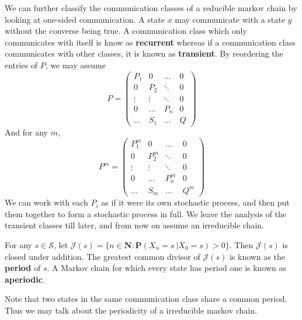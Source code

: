 We can further classify the communication classes of a reducible markov chain by looking at one-sided communication. A state $x$ may communicate with a state $y$ without the converse being true. A communication class which only communicates with itself is know as {\bf recurrent} whereas if a communication class communicates with other classes, it is known as {\bf transient}. By reordering the entries of $P$, we may assume
%
\[ P = \begin{pmatrix} P_1 & 0 & \dots & 0 \\ 0 & P_2 & \ddots & 0 \\ \vdots & \vdots & \ddots & 0 \\ 0 & \dots & P_n & 0 \\ \dots & S_1 & \dots & Q \end{pmatrix} \]
%
And for any $m$,
%
\[ P^m = \begin{pmatrix} P_1^m & 0 & \dots & 0 \\ 0 & P_2^m & \ddots & 0 \\ \vdots & \vdots & \ddots & 0 \\ 0 & \dots & P_n^m & 0 \\ \dots & S_m & \dots & Q^m \end{pmatrix} \]
%
We can work with each $P_i$ as if it were its own stochastic process, and then put them together to form a stochastic process in full. We leave the analysis of the transient classes till later, and from now on assume an irreducible chain.

\begin{definition}
    For any $s \in \mathcal{S}$, let $\mathcal{J}(s) = \{ n \in \mathbf{N} : \mathbf{P}(X_n = s\ | X_0 = s) > 0 \}$. Then $\mathcal{J}(s)$ is closed under addition. The greatest common divisor of $\mathcal{J}(s)$ is known as the {\bf period} of $s$. A Markov chain for which every state has period one is known as {\bf aperiodic}.
\end{definition}

Note that two states in the same communication class share a common period. Thus we may talk about the periodicity of a irreducible markov chain.

